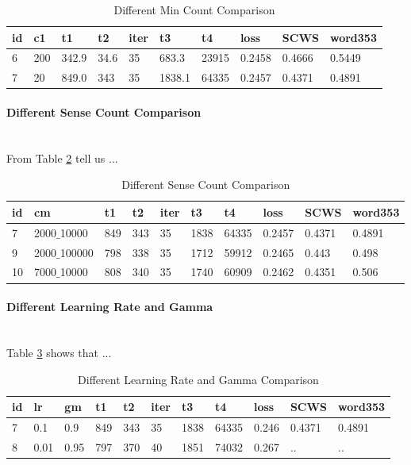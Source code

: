 \begin{table}[H]
\caption{Different Min Count Comparison} \label{tab:group2} 
\begin{center}
\begin{tabular}{|l|l|l|l|l|l|l|l|l|l|}
\hline
id& c1 & t1 & t2 & iter & t3 & t4 & loss & SCWS & word353	   \\ 
\hline
6 	&  200 	& 342.9	& 34.6	& 35	& 683.3 &	23915  & 0.2458 &0.4666 & 0.5449  \\ 
\hline
7	&  20	& 849.0	& 343	& 35	& 1838.1 &	64335  & 0.2457 &0.4371	&0.4891    \\ 
\hline
\end{tabular}
\end{center}
\end{table}

\paragraph{Different Sense Count Comparison} \ \\
From Table \ref{tab:group3} tell us ...

\begin{table}[H]
\caption{Different Sense Count Comparison} \label{tab:group3} 
\begin{center}
\begin{tabular}{|l|l|l|l|l|l|l|l|l|l|}
\hline
id& cm & t1 & t2 & iter & t3 & t4 &    loss  & 	SCWS & 	word353	   \\ 

\hline
7	& 2000$\_$10000	& 849	& 343	& 35	& 1838 &	64335  & 0.2457 &0.4371	&0.4891	  \\ 
\hline
9 	& 2000$\_$100000 	& 798	& 338	& 35	& 1712 &	59912  & 0.2465 &0.443 & 0.498  \\ 
\hline
10 	& 7000$\_$10000 	& 808	& 340	& 35	& 1740  &	60909  & 0.2462 &0.4351 & 0.506  \\ 
\hline
\end{tabular}
\end{center}
\end{table}


\paragraph{Different Learning Rate and Gamma} \ \\
Table \ref{tab:group4} shows that ...

\begin{table}[H]

\begin{center}
\begin{tabular}{|l|l|l|l|l|l|l|l|l|l|l|}
\hline
id& lr & gm & t1 & t2 & iter & t3 & t4 &    loss  & 	SCWS & 	word353	  \\ 
\hline
7	& 0.1		& 0.9		& 849	& 343	& 35	& 1838 &	64335  & 0.246 &0.4371	&0.4891	  \\ 
\hline
8	& 0.01		& 0.95		& 797	& 370	& 40	& 1851 &	74032  & 0.267 &..	&..	  \\ 
\hline
\end{tabular}
\caption{Different Learning Rate and Gamma Comparison} \label{tab:group4} 
\end{center}
\end{table}

